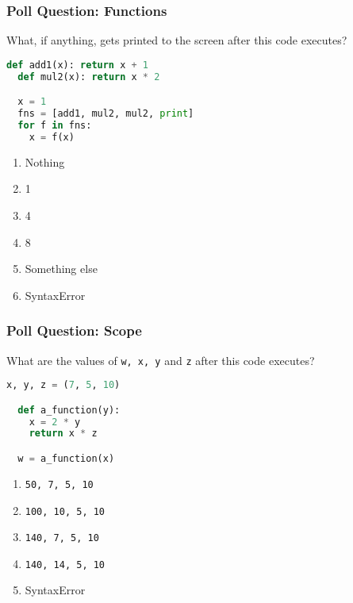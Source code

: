 \documentclass{beamer}
\begin{document}
%
%
\begin{frame}[fragile]
  \frametitle{Poll Question: Functions}
  What, if anything, gets printed to the screen after this code executes?
  \begin{lstlisting}[language=Python, autogobble]
  def add1(x): return x + 1
  def mul2(x): return x * 2

  x = 1
  fns = [add1, mul2, mul2, print]
  for f in fns:
    x = f(x)
  \end{lstlisting}
  \vfill
  \begin{enumerate}[A]
    \item Nothing 
    \item 1
    \item 4
    \item 8
    \item Something else
    \item SyntaxError
  \end{enumerate}
\end{frame}

%
%
\begin{frame}[fragile]
  \frametitle{Poll Question: Scope}
  What are the values of \lstinline|w, x, y| and \lstinline|z| after this code executes?
  \begin{lstlisting}[language=Python, autogobble]
  x, y, z = (7, 5, 10)

  def a_function(y):
    x = 2 * y
    return x * z

  w = a_function(x)
  \end{lstlisting}
  \vfill
  \begin{enumerate}[A]
    \item \lstinline|50, 7, 5, 10|
    \item \lstinline|100, 10, 5, 10|
    \item \lstinline|140, 7, 5, 10|
    \item \lstinline|140, 14, 5, 10|
    \item SyntaxError
  \end{enumerate}
\end{frame}
\end{document}
